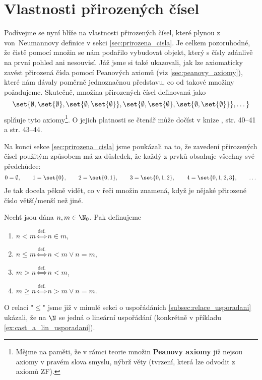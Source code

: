 \section{Vlastnosti přirozených čísel}\label{sec:vlastnosti_prirozenych_cisel}
Podívejme se nyní blíže na vlastnosti přirozených čísel, které plynou z von~Neumannovy definice v sekci \ref{sec:prirozena_cisla}. Je celkem pozoruhodné, že čistě pomocí množin se nám podařilo vybudovat objekt, který s čísly zdánlivě na první pohled ani nesouvisí. Jáž jsme si také ukazovali, jak lze axiomaticky zavést přirozená čísla pomocí Peanových axiomů (viz \ref{sec:peanovy_axiomy}), které nám dávaly poměrně jednoznačnou představu, co od takové množiny požadujeme. Skutečně, množina přirozených čísel definovaná jako
\begin{equation*}
    \set{\emptyset,\set{\emptyset},\set{\emptyset,\set{\emptyset}},\set{\emptyset,\set{\emptyset},\set{\emptyset,\set{\emptyset}}},\dots}
\end{equation*}
splňuje tyto axiomy\footnote{Mějme na paměti, že v rámci teorie množin \textbf{Peanovy axiomy} již nejsou axiomy v pravém slova smyslu, nýbrž věty (tvrzení, která lze odvodit z axiomů ZF).}. O jejich platnosti se čtenář může dočíst v knize \cite{Goldrei2017}, str. 40--41 a str. 43--44.\par
Na konci sekce \ref{sec:prirozena_cisla} jsme poukázali na to, že zavedení přirozených čísel použitým způsobem má za důsledek, že každý z prvků obsahuje všechny své předchůdce:
\begin{equation*}
    0=\emptyset,\qquad 1=\set{0},\qquad 2=\set{0,1},\qquad 3=\set{0,1,2},\qquad 4=\set{0,1,2,3},\qquad\dots
\end{equation*}
Je tak docela pěkně vidět, co v řeči množin znamená, když je nějaké přirozené číslo větší/menší než jiné.
\begin{definition}
    Nechť jsou dána $n,m\in\N_0$. Pak definujeme
    \begin{enumerate}[label=(\roman*)]
        \item $n<m\stackrel{\text{def.}}{\iff}n\in m$,
        \item $n\leq m\stackrel{\text{def.}}{\iff}n<m\lor n=m$,
        \item $m>n\stackrel{\text{def.}}{\iff}n<m$,
        \item $m\geq n\stackrel{\text{def.}}{\iff}n>m\lor n=m$.
    \end{enumerate}
\end{definition}
O relaci "$\leq$" jsme již v minulé sekci o uspořádáních \ref{subsec:relace_usporadani} ukázali, že na $\N$ se jedná o lineární uspořádání (konkrétně v příkladu \ref{ex:cast_a_lin_usporadani}). 